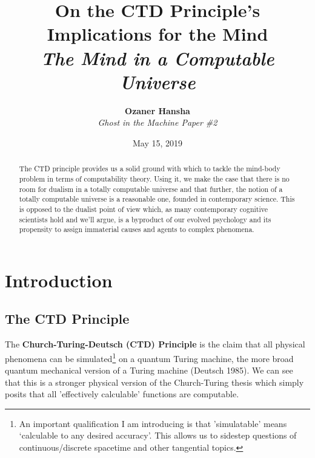 \documentclass[11pt]{diazessay} %
\title{\textbf{On the CTD Principle's Implications for the Mind} \\ {\vspace{5pt}\Large\itshape The Mind in a Computable Universe}} %
\author{\textbf{Ozaner Hansha} \\ \textit{Ghost in the Machine Paper \#2}} %
\date{May 15, 2019} %
\begin{document}
\maketitle %


\begin{abstract}
	The CTD principle provides us a solid ground with which to tackle the mind-body problem in terms of computability theory. Using it, we make the case that there is no room for dualism in a totally computable universe and that further, the notion of a totally computable universe is a reasonable one, founded in contemporary science. This is opposed to the dualist point of view which, as many contemporary cognitive scientists hold and we'll argue, is a byproduct of our evolved psychology and its propensity to assign immaterial causes and agents to complex phenomena.
\end{abstract}


\section{Introduction}
	\subsection{The CTD Principle}
		The \textbf{Church-Turing-Deutsch (CTD) Principle} is the claim that all physical phenomena can be simulated\footnote{An important qualification I am introducing is that 'simulatable' means `calculable to any desired accuracy'. This allows us to sidestep questions of continuous/discrete spacetime and other tangential topics.} on a quantum Turing machine, the more broad quantum mechanical version of a Turing machine (Deutsch 1985). We can see that this is a stronger physical version of the Church-Turing thesis which simply posits that all 'effectively calculable' functions are computable.
\end{document}
